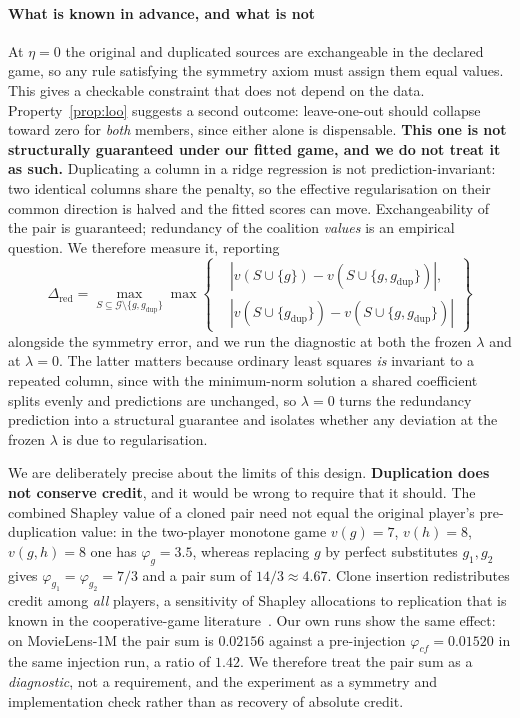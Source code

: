 \documentclass[pdflatex,sn-basic,Numbered]{sn-jnl}
\theoremstyle{plain}
\theoremstyle{definition}
\newcommand{\G}{\mathcal{G}}
\begin{document}
\paragraph{What is known in advance, and what is not}
At $\eta = 0$ the original and duplicated sources are exchangeable in the
declared game, so any rule satisfying the symmetry axiom must assign them equal
values. This gives a checkable constraint that does not depend on the data.
Property~\ref{prop:loo} suggests a second outcome: leave-one-out should
collapse toward zero for \emph{both} members, since either alone is
dispensable. \textbf{This one is not structurally guaranteed under our fitted
game, and we do not treat it as such.} Duplicating a column in a ridge
regression is not prediction-invariant: two identical columns share the
penalty, so the effective regularisation on their common direction is halved
and the fitted scores can move. Exchangeability of the pair is guaranteed;
redundancy of the coalition \emph{values} is an empirical question. We
therefore measure it, reporting
\begin{equation}
\Delta_{\mathrm{red}}
= \max_{S \subseteq \G\setminus\{g,g_{\mathrm{dup}}\}}
\max\left\{
\begin{aligned}
&|v(S\cup\{g\})-v(S\cup\{g,g_{\mathrm{dup}}\})|,\\
&|v(S\cup\{g_{\mathrm{dup}}\})-v(S\cup\{g,g_{\mathrm{dup}}\})|
\end{aligned}
\right\}
\label{eq:reddev}
\end{equation}
alongside the symmetry error, and we run the diagnostic at both the frozen
$\lambda$ and at $\lambda = 0$. The latter matters because ordinary least
squares \emph{is} invariant to a repeated column, since with the minimum-norm solution a shared coefficient splits evenly and predictions are unchanged, so $\lambda = 0$ turns the redundancy prediction into a structural guarantee and
isolates whether any deviation at the frozen $\lambda$ is due to
regularisation.

We are deliberately precise about the limits of this design.
\textbf{Duplication does not conserve credit}, and it would be wrong to require
that it should. The combined Shapley value of a cloned pair need not equal the
original player's pre-duplication value: in the two-player monotone game
$v(g)=7$, $v(h)=8$, $v(g,h)=8$ one has $\varphi_g = 3.5$, whereas replacing
$g$ by perfect substitutes $g_1,g_2$ gives
$\varphi_{g_1} = \varphi_{g_2} = 7/3$ and a pair sum of $14/3 \approx 4.67$.
Clone insertion redistributes credit among \emph{all} players, a sensitivity of
Shapley allocations to replication that is known in the cooperative-game
literature~\citep{han2022replication}. Our own runs show the same effect: on
MovieLens-1M the pair sum is $0.02156$ against a pre-injection
$\varphi_{cf} = 0.01520$ in the same injection run, a ratio of $1.42$. We therefore treat the pair sum as
a \emph{diagnostic}, not a requirement, and the experiment as a symmetry and
implementation check rather than as recovery of absolute credit.
\end{document}
